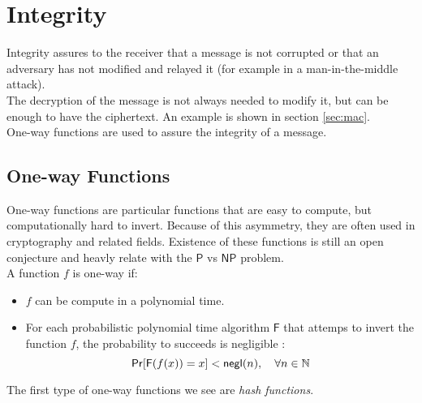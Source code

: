\section{Integrity}
Integrity assures to the receiver that a message is not corrupted or that an adversary has not modified and relayed it (for example in a man-in-the-middle attack).\\
The decryption of the message is not always needed to modify it, but can be enough to have the ciphertext. An example is shown in section \ref{sec:mac}.\\
One-way functions are used to assure the integrity of a message.

\subsection{One-way Functions}
One-way functions are particular functions that are easy to compute, but computationally hard to invert. Because of this asymmetry, they are often used in cryptography and related fields. Existence of these functions is still an open conjecture and heavly relate with the $\mathsf{P}$ vs $\mathsf{NP}$ problem.\\
A function $f$ is one-way if:
\begin{itemize}
    \item{$f$ can be compute in a polynomial time.}
    \item{For each probabilistic polynomial time algorithm $\mathsf{F}$ that attemps to invert the function $f$, the probability to succeeds is negligible : $$\mathsf{Pr}[\mathsf{F}(f(x)) = x] < \mathsf{negl}(n), \quad \forall n \in \mathbb{N}$$}
\end{itemize}
The first type of one-way functions we see are \emph{hash functions}.

